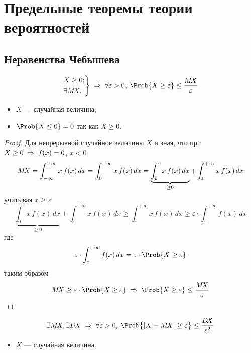 
\section{Предельные теоремы теории вероятностей}


\subsection{Неравенства Чебышева}

\begin{thm}
	\begin{equation}
		\left. \begin{aligned}
			&X \geq 0;\\
			&\exists \mx.
		\end{aligned} \right\} \Rarrow \forall \varepsilon > 0,\; \Prob \{ X \geq \varepsilon \} \leq \frac{\mx}{\varepsilon}
	\end{equation}
	\begin{itemize}
		\item $X$ --- случайная величина;
		\item $\Prob \{ X \leq 0 \} = 0$ так как $X \geq 0$.
	\end{itemize}
\end{thm}

\begin{proof}
	Для непрерывной случайное величины $X$ и зная, что при $X \geq 0 \;\Rightarrow\; f(x) = 0$, $x < 0$
	\[
		M\!X = \int_{-\infty}^{+\infty} x\, f(x)\, dx = \int_{0}^{+\infty} x\, f(x)\, dx = \underbrace{\int_{0}^{\varepsilon} x\, f(x)\, dx}_{\geq 0} + \int_{\varepsilon}^{+\infty} x\, f(x)\, dx
	\]
	учитывая $x \geq \varepsilon$
	\[
		\underbrace{\int_{0}^{\varepsilon} x\, f(x)\, dx}_{\geq 0} + \int_{\varepsilon}^{+\infty} x\, f(x)\, dx \geq \int_{\varepsilon}^{+\infty} x\, f(x)\, dx \geq \varepsilon\cdot\int_{\varepsilon}^{+\infty} f(x)\, dx
	\]
	где
	\[
		\varepsilon\cdot\int_{\varepsilon}^{+\infty} f(x)\, dx = \varepsilon\cdot\Prob\{ X \geq \varepsilon \}
	\]
	таким образом
	\[
		\mx \geq \varepsilon \cdot \Prob \{ X \geq \varepsilon \} \;\Rightarrow\; \Prob \{ X \geq \varepsilon \} \leq \frac{\mx}{\varepsilon}
	\]
\end{proof}

\begin{thm}
	\begin{equation}
		\exists \mx, \exists \dx \Rarrow \forall \varepsilon > 0,\; \Prob \bigl\{ |X - \mx| \geq \varepsilon \bigr\} \leq \frac{\dx}{\varepsilon^2}
	\end{equation}
	\begin{itemize}
		\item $X$ --- случайная величина.
	\end{itemize}
\end{thm}

